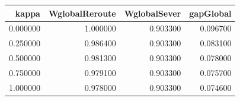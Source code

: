 \begin{tabular}{rrrr}
\toprule
kappa & WglobalReroute & WglobalSever & gapGlobal \\
\midrule
0.000000 & 1.000000 & 0.903300 & 0.096700 \\
0.250000 & 0.986400 & 0.903300 & 0.083100 \\
0.500000 & 0.981300 & 0.903300 & 0.078000 \\
0.750000 & 0.979100 & 0.903300 & 0.075700 \\
1.000000 & 0.978000 & 0.903300 & 0.074600 \\
\bottomrule
\end{tabular}
